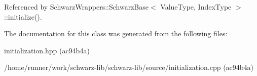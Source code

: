 Referenced by Schwarz\+Wrappers\+::\+Schwarz\+Base$<$ Value\+Type, Index\+Type $>$\+::initialize().



The documentation for this class was generated from the following files\+:\begin{DoxyCompactItemize}
\item 
initialization.\+hpp (ac94b4a)\item 
/home/runner/work/schwarz-\/lib/schwarz-\/lib/source/initialization.\+cpp (ac94b4a)\end{DoxyCompactItemize}
